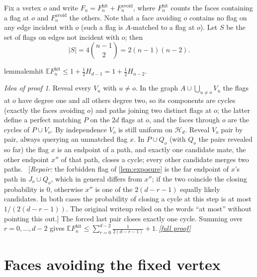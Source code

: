 \documentclass[11pt,a4paper]{article}
\theoremstyle{plain}
\theoremstyle{definition}
\theoremstyle{remark}
\newtheorem*{proofidea}{Idea of proof}
\newcommand{\fullproofref}[1]{\,\hyperref[#1]{\textit{[full proof]}}}
\newcommand{\E}{\mathbb E}
\newcommand{\cH}{\mathcal H}
\newcommand{\Fhit}{F_n^{\mathrm{hit}}}
\newcommand{\Favoid}{F_n^{\mathrm{avoid}}}
\newcommand{\repair}[1]{\ [\textit{Repair:} #1]}
\begin{document}
Fix a vertex $o$ and write $F_n=\Fhit+\Favoid$, where $\Fhit$ counts the faces containing a flag at $o$ and $\Favoid$ the others. Note that a face avoiding $o$ contains no flag on any edge incident with $o$ (such a flag is $A$-matched to a flag at $o$). Let $S$ be the set of flags on edges not incident with $o$; then
\begin{equation}\label{eq:S}
|S|=4\binom{n-1}2=2(n-1)(n-2).
\end{equation}

\begin{restatable}{lemma}{lemhit}\label{lem:hit}
$\displaystyle\E\Fhit\le1+\tfrac12H_{d-1}=1+\tfrac12H_{n-2}$.
\end{restatable}
\begin{proofidea}
Reveal every $V_u$ with $u\ne o$. In the graph $A\cup\bigcup_{u\ne o}V_u$ the flags at $o$ have degree one and all others degree two, so its components are cycles (exactly the faces avoiding $o$) and paths joining two distinct flags at $o$; the latter define a perfect matching $P$ on the $2d$ flags at $o$, and the faces through $o$ are the cycles of $P\cup V_o$. By independence $V_o$ is still uniform on $\cH_d$. Reveal $V_o$ pair by pair, always querying an unmatched flag $x$. In $P\cup Q_o$ (with $Q_o$ the pairs revealed so far) the flag $x$ is an endpoint of a path, and exactly one candidate mate, the other endpoint $x''$ of that path, closes a cycle; every other candidate merges two paths. \repair{the forbidden flag of \cref{lem:exposure} is the far endpoint of $x$'s path in $J_o\cup Q_o$, which in general differs from $x''$; if the two coincide the closing probability is $0$, otherwise $x''$ is one of the $2(d-r-1)$ equally likely candidates. In both cases the probability of closing a cycle at this step is at most $1/(2(d-r-1))$. The original writeup relied on the words ``at most'' without pointing this out.} The forced last pair closes exactly one cycle. Summing over $r=0,\dots,d-2$ gives $\E\Fhit\le\sum_{r=0}^{d-2}\frac1{2(d-r-1)}+1$.\fullproofref{pf:hit}
\end{proofidea}

\section{Faces avoiding the fixed vertex}\label{sec:avoid}
\end{document}

